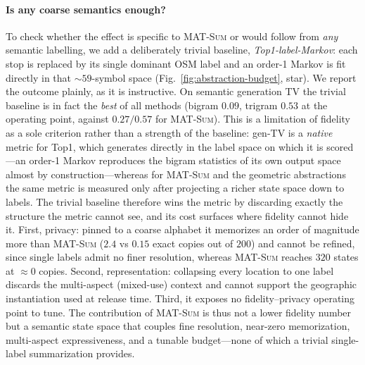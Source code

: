 \documentclass[sigconf,nonacm]{acmart}
\begin{document}
\paragraph{Is any coarse semantics enough?}
To check whether the effect is specific to \textsc{MAT-Sum} or would follow from \emph{any} semantic
labelling, we add a deliberately trivial baseline, \emph{Top1-label-Markov}: each stop is replaced by
its single dominant OSM label and an order-1 Markov is fit directly in that ${\sim}59$-symbol space
(Fig.~\ref{fig:abstraction-budget}, star). We report the outcome plainly, as it is instructive. On
semantic generation TV the trivial baseline is in fact the \emph{best} of all methods (bigram $0.09$,
trigram $0.53$ at the operating point, against $0.27/0.57$ for \textsc{MAT-Sum}). This is a limitation
of fidelity as a sole criterion rather than a strength of the baseline: gen-TV is a \emph{native}
metric for Top1, which generates directly in the label space on which it is scored---an order-1 Markov
reproduces the bigram statistics of its own output space almost by construction---whereas for
\textsc{MAT-Sum} and the geometric abstractions the same metric is measured only after projecting a
richer state space down to labels. The trivial baseline therefore wins the metric by discarding
exactly the structure the metric cannot see, and its cost surfaces where fidelity cannot hide it.
First, privacy: pinned to a coarse alphabet it memorizes an order of magnitude more than
\textsc{MAT-Sum} ($2.4$ vs $0.15$ exact copies out of $200$) and cannot be refined, since single
labels admit no finer resolution, whereas \textsc{MAT-Sum} reaches $320$ states at $\approx0$ copies.
Second, representation: collapsing every location to one label discards the multi-aspect (mixed-use)
context and cannot support the geographic instantiation used at release time. Third, it exposes no
fidelity--privacy operating point to tune. The contribution of \textsc{MAT-Sum} is thus not a lower
fidelity number but a semantic state space that couples fine resolution, near-zero memorization,
multi-aspect expressiveness, and a tunable budget---none of which a trivial single-label summarization
provides.

\end{document}
